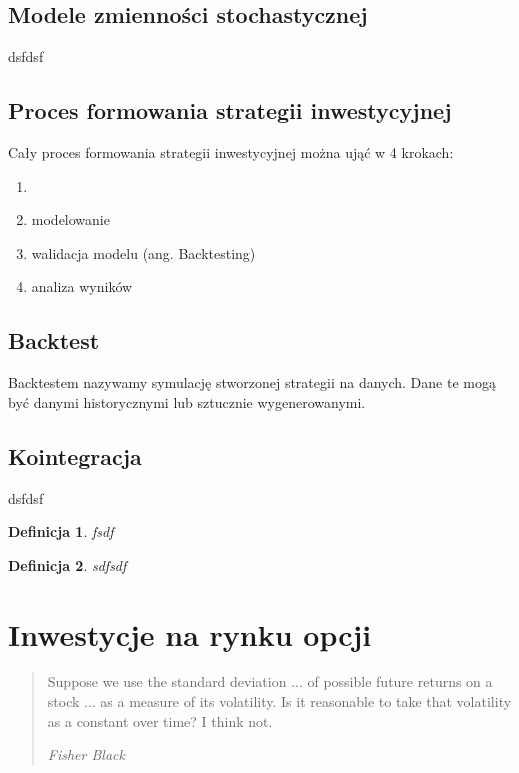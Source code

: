 \documentclass{pracamgr}
\newtheorem{defi}{Definicja}[section]
\begin{document}
\section{Modele zmienności stochastycznej}
dsfdsf

\section{Proces formowania strategii inwestycyjnej}
Cały proces formowania strategii inwestycyjnej można ująć w 4 krokach:

\begin{enumerate}
\item 
\item modelowanie
\item walidacja modelu (ang. Backtesting)
\item analiza wyników 
\end{enumerate}

\section{Backtest}
Backtestem nazywamy symulację stworzonej strategii na danych. Dane te mogą
być danymi historycznymi lub sztucznie wygenerowanymi.

\section{Kointegracja}
dsfdsf

\begin{defi}\label{aa}
fsdf
\end{defi}

\begin{defi}\label{aaa}
sdfsdf
\end{defi}




%
%
\chapter{Inwestycje na rynku opcji}
\begin{quote}
  Suppose we use the standard deviation ... of possible future returns on
  a stock ... as a measure of its volatility. Is it reasonable to take
  that volatility as a constant over time? I think not.

\raggedleft\slshape Fisher Black 
\end{quote}
\end{document}
